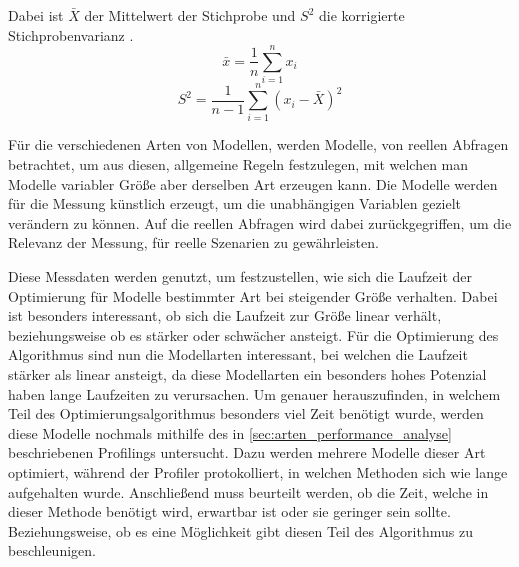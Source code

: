 \begin{equation*}
    [\bar{X} - t_{n-1,1-\alpha/2}\sqrt{S^2/n}, \bar{X} +
    t_{n-1,1-\alpha/2}\sqrt{S^2/n}]
\end{equation*}

Dabei ist $\bar{X}$ der Mittelwert der Stichprobe und $S^2$ die korrigierte
Stichprobenvarianz \autocites[vgl.][59, 502]{Statistik}. 
\begin{equation*}
    \bar{x} = \frac{1}{n} \displaystyle\sum^{n}_{i=1}x_i 
\end{equation*}
\begin{equation*}
    S^2 = \frac{1}{n-1}\displaystyle\sum^{n}_{i=1}(x_i-\bar{X})^2
\end{equation*}

Für die verschiedenen Arten von Modellen, werden Modelle, von reellen Abfragen
betrachtet, um aus diesen, allgemeine Regeln festzulegen, mit welchen man
Modelle variabler Größe aber derselben Art erzeugen kann. Die Modelle werden
für die Messung künstlich erzeugt, um die unabhängigen Variablen gezielt
verändern zu können. Auf die reellen Abfragen wird dabei zurückgegriffen, um
die Relevanz der Messung, für reelle Szenarien zu gewährleisten.
\autocite[Vgl.][500f]{ExperimentalAnalysis}

Diese Messdaten werden genutzt, um festzustellen, wie sich die Laufzeit der
Optimierung für Modelle bestimmter Art bei steigender Größe verhalten. Dabei
ist besonders interessant, ob sich die Laufzeit zur Größe linear verhält,
beziehungsweise ob es stärker oder schwächer ansteigt. Für die Optimierung des
Algorithmus sind nun die Modellarten interessant, bei welchen die Laufzeit
stärker als linear ansteigt, da diese Modellarten ein besonders hohes Potenzial
haben lange Laufzeiten zu verursachen. Um genauer herauszufinden, in welchem
Teil des Optimierungsalgorithmus besonders viel Zeit benötigt wurde, werden
diese Modelle nochmals mithilfe des in \autoref{sec:arten_performance_analyse}
beschriebenen Profilings untersucht. Dazu werden mehrere Modelle dieser Art
optimiert, während der Profiler protokolliert, in welchen Methoden sich wie
lange aufgehalten wurde. Anschließend muss beurteilt werden, ob die Zeit,
welche in dieser Methode benötigt wird, erwartbar ist oder sie geringer sein
sollte. Beziehungsweise, ob es eine Möglichkeit gibt diesen Teil des
Algorithmus zu beschleunigen.
